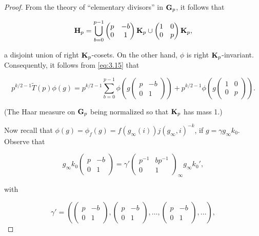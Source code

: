 \begin{proof}

From the theory of ``elementary divisors'' in $\mathbf{G}_p$, it follows that

\[
\mathbf{H}_p = \bigcup_{b=0}^{p-1}\begin{pmatrix} p & -b \\ 0 & 1 \end{pmatrix}\mathbf{K}_p \cup \begin{pmatrix} 1 & 0 \\ 0 & p \end{pmatrix}\mathbf{K}_p,
\]

a disjoint union of right $\mathbf{K}_p$-cosets. On the other hand, $\phi$ is right $\mathbf{K}_p$-invariant. Consequently, it follows from \eqref{eq:3.15} that

\[
p^{k/2-1}\tilde{T}(p)\phi(g) = p^{k/2-1}\sum_{b=0}^{p-1}\phi\left(g\begin{pmatrix} p & -b \\ 0 & 1 \end{pmatrix}\right) + p^{k/2-1}\phi\left(g\begin{pmatrix} 1 & 0 \\ 0 & p \end{pmatrix}\right).
\]

(The Haar measure on $\mathbf{G}_p$ being normalized so that $\mathbf{K}_p$ has mass 1.)

Now recall that $\phi(g) = \phi_f(g) = f(g_\infty(i))j(g_\infty,i)^{-k}$, if $g = \gamma g_\infty k_0$. Observe that

\[
g_\infty k_0\begin{pmatrix} p & -b \\ 0 & 1 \end{pmatrix} = \gamma'\begin{pmatrix} p^{-1} & bp^{-1} \\ 0 & 1 \end{pmatrix}_{\infty}g_\infty k_0',
\]

with

\[
\gamma' = \left(\begin{pmatrix} p & -b \\ 0 & 1 \end{pmatrix}, \begin{pmatrix} p & -b \\ 0 & 1 \end{pmatrix}, \dots, \begin{pmatrix} p & -b \\ 0 & 1 \end{pmatrix}, \dots\right),
\]


\end{proof}
